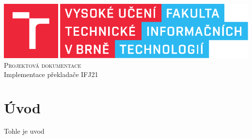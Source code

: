 \documentclass[11pt]{article}
\begin{document}
\begin{titlepage}
    \begin{center}
        \includegraphics[scale=0.8]{pics/fitlogo.pdf} \\
    
        \textsc{\Huge Projektová dokumentace}\\
        
        \LARGE
            Implementace překladače IFJ21
    \end{center}
    

\end{titlepage}

\newpage
\tableofcontents
\thispagestyle{empty}
\newpage
\setcounter{page}{1}


\section*{Úvod}
Tohle je uvod
\end{document}
